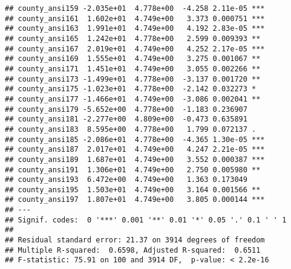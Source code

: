 \documentclass[
]{book}
\newenvironment{Shaded}{\begin{snugshade}}{\end{snugshade}}
\newcommand{\AttributeTok}[1]{\textcolor[rgb]{0.77,0.63,0.00}{#1}}
\newcommand{\FunctionTok}[1]{\textcolor[rgb]{0.00,0.00,0.00}{#1}}
\newcommand{\NormalTok}[1]{#1}
\newcommand{\OtherTok}[1]{\textcolor[rgb]{0.56,0.35,0.01}{#1}}
\newcommand{\SpecialCharTok}[1]{\textcolor[rgb]{0.00,0.00,0.00}{#1}}
\newcommand{\StringTok}[1]{\textcolor[rgb]{0.31,0.60,0.02}{#1}}
\begin{document}
\begin{verbatim}
## county_ansi159 -2.035e+01  4.778e+00  -4.258 2.11e-05 ***
## county_ansi161  1.602e+01  4.749e+00   3.373 0.000751 ***
## county_ansi163  1.991e+01  4.749e+00   4.192 2.83e-05 ***
## county_ansi165  1.242e+01  4.778e+00   2.599 0.009393 ** 
## county_ansi167  2.019e+01  4.749e+00   4.252 2.17e-05 ***
## county_ansi169  1.555e+01  4.749e+00   3.275 0.001067 ** 
## county_ansi171  1.451e+01  4.749e+00   3.055 0.002266 ** 
## county_ansi173 -1.499e+01  4.778e+00  -3.137 0.001720 ** 
## county_ansi175 -1.023e+01  4.778e+00  -2.142 0.032273 *  
## county_ansi177 -1.466e+01  4.749e+00  -3.086 0.002041 ** 
## county_ansi179 -5.652e+00  4.778e+00  -1.183 0.236907    
## county_ansi181 -2.277e+00  4.809e+00  -0.473 0.635891    
## county_ansi183  8.595e+00  4.778e+00   1.799 0.072137 .  
## county_ansi185 -2.086e+01  4.778e+00  -4.365 1.30e-05 ***
## county_ansi187  2.017e+01  4.749e+00   4.247 2.21e-05 ***
## county_ansi189  1.687e+01  4.749e+00   3.552 0.000387 ***
## county_ansi191  1.306e+01  4.749e+00   2.750 0.005980 ** 
## county_ansi193  6.472e+00  4.749e+00   1.363 0.173049    
## county_ansi195  1.503e+01  4.749e+00   3.164 0.001566 ** 
## county_ansi197  1.807e+01  4.749e+00   3.805 0.000144 ***
## ---
## Signif. codes:  0 '***' 0.001 '**' 0.01 '*' 0.05 '.' 0.1 ' ' 1
## 
## Residual standard error: 21.37 on 3914 degrees of freedom
## Multiple R-squared:  0.6598, Adjusted R-squared:  0.6511 
## F-statistic: 75.91 on 100 and 3914 DF,  p-value: < 2.2e-16
\end{verbatim}

\begin{Shaded}
\end{Shaded}
\end{document}
